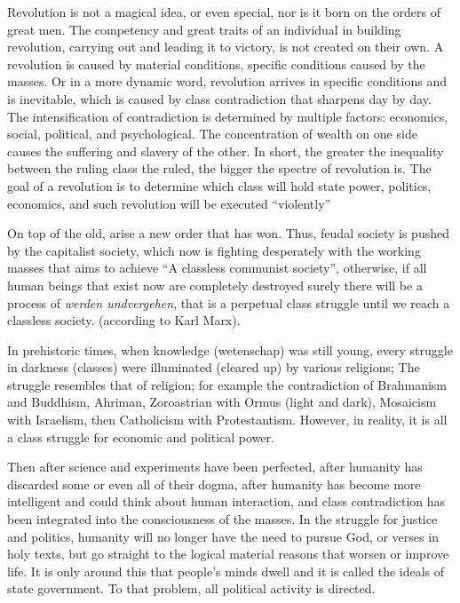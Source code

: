 Revolution is not a magical idea, or even special, nor is it born on the orders of great men. 
The competency and great traits of an individual in building revolution, carrying out and leading it to 
victory, is not created on their own. A revolution is caused by material conditions, specific conditions 
caused by the masses. Or in a more dynamic word, revolution arrives in specific conditions and is inevitable, 
which is caused by class contradiction that sharpens day by day. The intensification of contradiction is 
determined by multiple factors: economics, social, political, and psychological. The concentration of wealth on 
one side causes the suffering and slavery of the other. In short, the greater the inequality between the ruling 
class the ruled, the bigger the spectre of revolution is. The goal of a revolution is to determine which class 
will hold state power, politics, economics, and such revolution will be executed “violently”\nline

On top of the old, arise a new order that has won. Thus, feudal society is pushed by the capitalist 
society, which now is fighting desperately with the working masses that aims to achieve “A classless communist society”, 
otherwise, if all human beings that exist now are completely destroyed surely there will be a process of \emph{werden undvergehen}, 
that is a perpetual class struggle until we reach a classless society. (according to Karl Marx).\nline

In prehistoric times, when knowledge (wetenschap) was still young, every struggle in darkness (classes) were illuminated 
(cleared up) by various religions; The struggle resembles that of religion; for example the contradiction of Brahmanism 
and Buddhism, Ahriman, Zoroastrian with Ormus (light and dark), Mosaicism with Israelism, then Catholicism with Protestantism. 
However, in reality, it is all a class struggle for economic and political power.\nline

Then after science and experiments have been perfected, after humanity has discarded some or even all of their dogma, 
after humanity has become more intelligent and could think about human interaction, and class contradiction has 
been integrated into the consciousness of the masses. In the struggle for justice and politics, humanity will no 
longer have the need to pursue God, or verses in holy texts, but go straight to the logical material reasons that 
worsen or improve life. It is only around this that people's minds dwell and it is called the ideals of state government. 
To that problem, all political activity is directed.\nline


